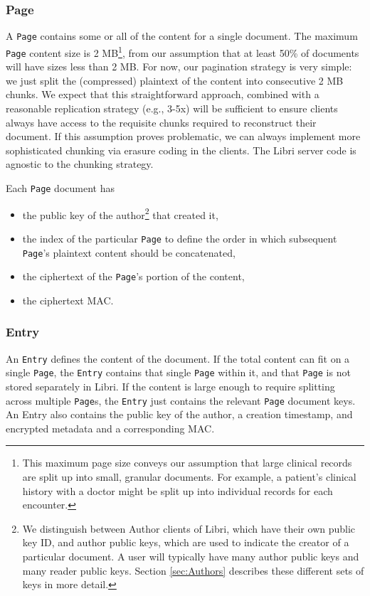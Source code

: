 \documentclass[10pt]{article}
\newcommand{\ttt}[1]{\texttt{#1}}
\def\Entry{\ttt{Entry}}
\def\Page{\ttt{Page}}
\begin{document}
\subsubsection{Page}
A \Page{} contains some or all of the content for a single document. The maximum \Page {} content size is 2 MB\footnote{This maximum page size conveys our assumption that large clinical records are split up into small, granular documents. For example, a patient's clinical history with a doctor might be split up into individual records for each encounter.}, from our assumption that at least 50\% of documents will have sizes less than 2 MB. For now, our pagination strategy is very simple: we just split the (compressed) plaintext of the content into consecutive 2 MB chunks. We expect that this straightforward approach, combined with a reasonable replication strategy (e.g., 3-5x) will be sufficient to ensure clients always have access to the requisite chunks required to reconstruct their document. If this assumption proves problematic, we can always implement more sophisticated chunking via erasure coding in the clients. The Libri server code is agnostic to the chunking strategy.

Each \Page{} document has 
\begin{itemize}
	\item the public key of the author\footnote{We distinguish between Author clients of Libri, which have their own public key ID, and author public keys, which are used to indicate the creator of a particular document. A user will typically have many author public keys and many reader public keys. Section \ref{sec:Authors} describes these different sets of keys in more detail.} that created it,
	\item the index of the particular \Page{} to define the order in which subsequent \Page{}'s plaintext content should be concatenated,
	\item the ciphertext of the \Page{}'s portion of the content,
	\item the ciphertext MAC.
\end{itemize}

\subsubsection{Entry}
An \Entry{} defines the content of the document. If the total content can fit on a single \Page{}, the \Entry{} contains that single \Page{} within it, and that \Page{} is not stored separately in Libri. If the content is large enough to require splitting across multiple \Page{}s, the \Entry{} just contains the relevant \Page{} document keys. An Entry also contains the public key of the author, a creation timestamp, and encrypted metadata and a corresponding MAC. 
\end{document}
